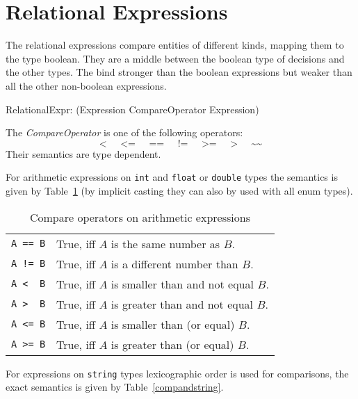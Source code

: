\section{Relational Expressions}\label{sec:relational}

The relational expressions compare entities of different kinds, mapping them to the type boolean.
They are a middle between the boolean type of decisions and the other types.
The bind stronger than the boolean expressions but weaker than all the other non-boolean expressions.

\begin{rail}
 RelationalExpr: (Expression CompareOperator Expression)
\end{rail}

The \emph{CompareOperator} is one of the following operators:
\[ \texttt{<} \;\;\;\;\; \texttt{<=} \;\;\;\;\; \texttt{==} \;\;\;\;\; \texttt{!=} \;\;\;\;\; \texttt{>=} \;\;\;\;\; \texttt{>} \;\;\;\;\; \texttt{\textasciitilde\textasciitilde} \]
Their semantics are type dependent.

For arithmetic expressions on \texttt{int} and \texttt{float} or \texttt{double} types
the semantics is given by Table~\ref{compandarithmetic} (by implicit casting they can also by used with all enum types).

\begin{table}[htbp]
  \centering
  \begin{tabularx}{\linewidth}{|l|X|} \hline
    \texttt{A == B} & True, iff $A$ is the same number as $B$. \\
    \texttt{A != B} & True, iff $A$ is a different number than $B$. \\
    \texttt{A <\ \ B} & True, iff $A$ is smaller than and not equal $B$. \\
    \texttt{A >\ \ B} & True, iff $A$ is greater than and not equal $B$. \\
    \texttt{A <= B} & True, iff $A$ is smaller than (or equal) $B$. \\
    \texttt{A >= B} & True, iff $A$ is greater than (or equal) $B$. \\ \hline
  \end{tabularx}
  \caption{Compare operators on arithmetic expressions}
  \label{compandarithmetic}
\end{table}

For expressions on \texttt{string} types lexicographic order is used for comparisons,
the exact semantics is given by Table~\ref{compandstring}.

